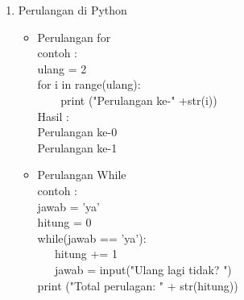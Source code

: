 \begin{enumerate}
\item Perulangan di Python
\begin{itemize}
\item Perulangan for\\
contoh :\\
ulang = 2\\
for i in range(ulang):\\
\verb|    |print ("Perulangan ke-" +str(i))\\
Hasil :\\
Perulangan ke-0\\
Perulangan ke-1\\
\item Perulangan While\\
contoh :\\
jawab = 'ya'\\
hitung = 0\\
while(jawab == 'ya'):\\
\verb|   |hitung += 1\\
\verb|   |jawab = input("Ulang lagi tidak? ")\\
print ("Total perulagan: " + str(hitung))\\
\end{itemize}


\end{enumerate}
